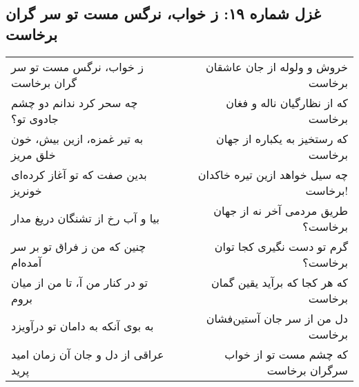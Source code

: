 \begin{center}
\section*{غزل شماره ۱۹: ز خواب، نرگس مست تو سر گران برخاست}
\label{sec:019}
\begin{longtable}{l p{0.5cm} r}
ز خواب، نرگس مست تو سر گران برخاست
&&
خروش و ولوله از جان عاشقان برخاست
\\
چه سحر کرد ندانم دو چشم جادوی تو؟
&&
که از نظارگیان ناله و فغان برخاست
\\
به تیر غمزه، ازین بیش، خون خلق مریز
&&
که رستخیز به یکباره از جهان برخاست
\\
بدین صفت که تو آغاز کرده‌ای خونریز
&&
چه سیل خواهد ازین تیره خاکدان برخاست!
\\
بیا و آب رخ از تشنگان دریغ مدار
&&
طریق مردمی آخر نه از جهان برخاست؟
\\
چنین که من ز فراق تو بر سر آمده‌ام
&&
گرم تو دست نگیری کجا توان برخاست؟
\\
تو در کنار من آ، تا من از میان بروم
&&
که هر کجا که برآید یقین گمان برخاست
\\
به بوی آنکه به دامان تو درآویزد
&&
دل من از سر جان آستین‌فشان برخاست
\\
عراقی از دل و جان آن زمان امید پرید
&&
که چشم مست تو از خواب سرگران برخاست
\\
\end{longtable}
\end{center}

